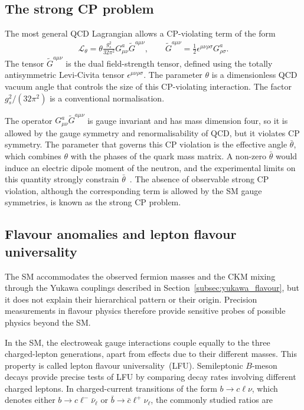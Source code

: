 \subsection{The strong CP problem}
\label{subsec:strong_cp}

The most general QCD Lagrangian allows a CP-violating term of the form
\begin{align*}
    \mathcal{L}_{\theta}
    =
    \theta
    \frac{g_{s}^{2}}{32\pi^{2}}
    G_{\mu\nu}^{a}
    \tilde{G}^{a\mu\nu},
    \qquad
    \tilde{G}^{a\mu\nu}
    =
    \frac{1}{2}
    \epsilon^{\mu\nu\rho\sigma}
    G_{\rho\sigma}^{a}.
\end{align*}
The tensor $\tilde{G}^{a\mu\nu}$ is the dual field-strength tensor, defined using the totally antisymmetric Levi-Civita tensor $\epsilon^{\mu\nu\rho\sigma}$. 
The parameter $\theta$ is a dimensionless QCD vacuum angle that controls the size of this CP-violating interaction. 
The factor $g_{s}^{2}/(32\pi^{2})$ is a conventional normalisation.

The operator $G_{\mu\nu}^{a}\tilde{G}^{a\mu\nu}$ is gauge invariant and has mass dimension four, so it is allowed by the gauge symmetry and renormalisability of QCD, but it violates CP symmetry. 
The parameter that governs this CP violation is the effective angle $\bar{\theta}$, which combines $\theta$ with the phases of the quark mass matrix. 
A non-zero $\bar{\theta}$ would induce an electric dipole moment of the neutron, and the experimental limits on this quantity strongly constrain $\bar{\theta}$~\cite{Baker2006}. 
The absence of observable strong CP violation, although the corresponding term is allowed by the SM gauge symmetries, is known as the strong CP problem.


\subsection{Flavour anomalies and lepton flavour universality}
\label{subsec:flavour_anomalies}

The SM accommodates the observed fermion masses and the CKM mixing through the Yukawa couplings described in Section~\ref{subsec:yukawa_flavour}, but it does not explain their hierarchical pattern or their origin. 
Precision measurements in flavour physics therefore provide sensitive probes of possible physics beyond the SM.

In the SM, the electroweak gauge interactions couple equally to the three charged-lepton generations, apart from effects due to their different masses. This property is called lepton flavour universality~(LFU). 
Semileptonic $B$-meson decays provide precise tests of LFU by comparing decay rates involving different charged leptons. 
In charged-current transitions of the form $b\to c\ell\nu$, which denotes either $b\to c\ell^-\bar\nu_\ell$ or $\bar b\to\bar c\ell^+\nu_\ell$, the commonly studied ratios are

